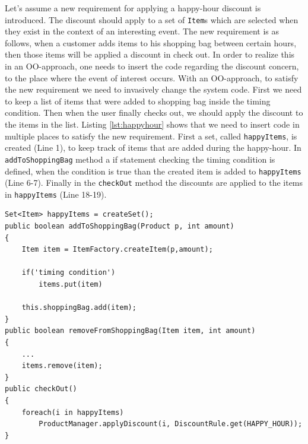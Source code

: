 Let's assume a new requirement for applying a happy-hour discount is introduced. The discount should apply to a set of \texttt{Item}s which are selected when they exist in the context of an interesting event. The new requirement is as follows, \textsf{when a customer adds items to his shopping bag between certain hours, then those items will be applied a discount in check out}. In order to realize this in an OO-approach, one needs to insert the code regarding the discount concern, to the place where the event of interest occurs.
With an OO-approach, to satisfy the new requirement we need to invasively change the system code. First we need to keep a list of items that were added to shopping bag inside the timing condition. Then when the user finally checks out, we should apply the discount to the items in the list. Listing \ref{lst:happyhour} shows that we need to insert code in multiple places to satisfy the new requirement. First a set, called \texttt{happyItems}, is created (Line 1), to keep track of items that are added during the happy-hour. In \texttt{addToShoppingBag} method a if statement checking the timing condition is defined, when the condition is true than the created item is added to \texttt{happyItems} (Line 6-7).  Finally in the \texttt{checkOut} method the discounts are applied to the items in \texttt{happyItems} (Line 18-19). 

\begin{lstlisting}[float, caption={A Java implementation of Happy-hour discount rule}, label={lst:happyhour}]
Set<Item> happyItems = createSet();
public boolean addToShoppingBag(Product p, int amount)
{
	Item item = ItemFactory.createItem(p,amount);
	
	if('timing condition')
		items.put(item)
	
	this.shoppingBag.add(item);
}
public boolean removeFromShoppingBag(Item item, int amount)
{
	...
	items.remove(item);
}
public checkOut()
{
	foreach(i in happyItems)
		ProductManager.applyDiscount(i, DiscountRule.get(HAPPY_HOUR));
}
\end{lstlisting}

